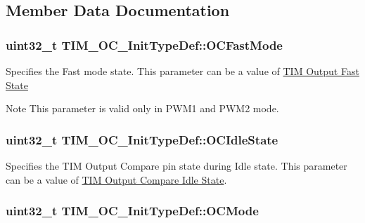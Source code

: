 \subsection{Member Data Documentation}
\hypertarget{struct_t_i_m___o_c___init_type_def_a4c4203c5ed779ac86fb793bb9d628e55}{
\subsubsection[{O\-C\-Fast\-Mode}]{\setlength{\rightskip}{0pt plus 5cm}uint32\-\_\-t T\-I\-M\-\_\-\-O\-C\-\_\-\-Init\-Type\-Def\-::\-O\-C\-Fast\-Mode}}\label{struct_t_i_m___o_c___init_type_def_a4c4203c5ed779ac86fb793bb9d628e55}
Specifies the Fast mode state. This parameter can be a value of \hyperlink{group___t_i_m___output___fast___state}{T\-I\-M Output Fast State} \begin{DoxyNote}{Note}
This parameter is valid only in P\-W\-M1 and P\-W\-M2 mode. 
\end{DoxyNote}
\hypertarget{struct_t_i_m___o_c___init_type_def_ace3e2b76ca2fca0f4961585ed9ebecf5}{
\subsubsection[{O\-C\-Idle\-State}]{\setlength{\rightskip}{0pt plus 5cm}uint32\-\_\-t T\-I\-M\-\_\-\-O\-C\-\_\-\-Init\-Type\-Def\-::\-O\-C\-Idle\-State}}\label{struct_t_i_m___o_c___init_type_def_ace3e2b76ca2fca0f4961585ed9ebecf5}
Specifies the T\-I\-M Output Compare pin state during Idle state. This parameter can be a value of \hyperlink{group___t_i_m___output___compare___idle___state}{T\-I\-M Output Compare Idle State}. \hypertarget{struct_t_i_m___o_c___init_type_def_ae5faa1cba0b3f1ab6179cc54e1015ee8}{
\subsubsection[{O\-C\-Mode}]{\setlength{\rightskip}{0pt plus 5cm}uint32\-\_\-t T\-I\-M\-\_\-\-O\-C\-\_\-\-Init\-Type\-Def\-::\-O\-C\-Mode}}\label{struct_t_i_m___o_c___init_type_def_ae5faa1cba0b3f1ab6179cc54e1015ee8}
